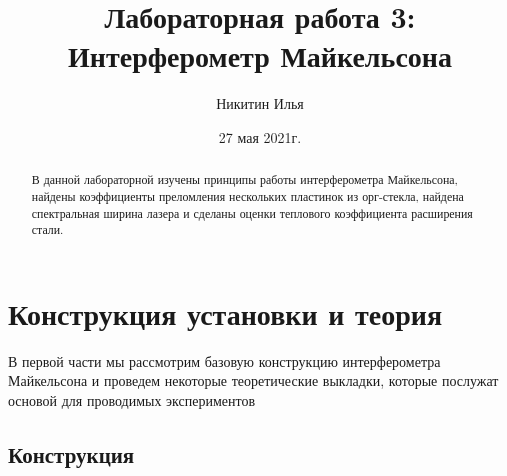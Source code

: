 \documentclass[%
reprint,
russian,
 amsmath,amssymb,
 aps,
]{revtex4-2}
\begin{document}

\title{Лабораторная работа 3:\\Интерферометр Майкельсона}%

\author{Никитин Илья}
 \date{27 мая 2021г.}
\begin{abstract}
В данной лабораторной изучены принципы работы интерферометра Майкельсона, найдены коэффициенты преломления нескольких пластинок из орг-стекла, найдена спектральная ширина лазера и сделаны оценки теплового коэффициента расширения стали.
\end{abstract}

\maketitle

\tableofcontents

\section{\label{sec:level1}Конструкция установки и теория}

В первой части мы рассмотрим базовую конструкцию интерферометра Майкельсона и проведем некоторые теоретические выкладки, которые послужат основой для проводимых экспериментов

\subsection{\label{sec:level2}Конструкция}
\end{document}
